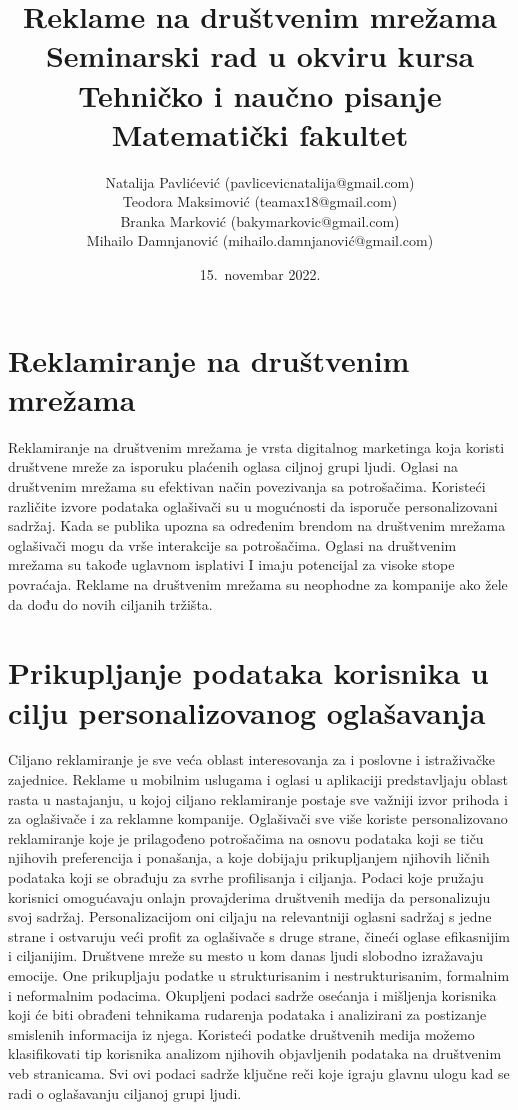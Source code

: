 \documentclass[a4paper]{article}
\title{Reklame na društvenim mrežama\\ \small{Seminarski rad u okviru kursa\\Tehničko i naučno pisanje\\ Matematički fakultet}}
\author{Natalija Pavlićević (pavlicevicnatalija@gmail.com)\\ Teodora Maksimović (teamax18@gmail.com)\\ Branka Marković (bakymarkovic@gmail.com)\\ Mihailo Damnjanović (mihailo.damnjanović@gmail.com)}
\date{15.~novembar 2022.}
\begin{document}
	
	
	\tableofcontents
	
	\newpage
	
	\section{Reklamiranje na društvenim mrežama}
	\label{sec:uvod}
	Reklamiranje na društvenim mrežama je vrsta digitalnog marketinga koja koristi društvene mreže za isporuku plaćenih oglasa ciljnoj grupi ljudi. Oglasi na društvenim mrežama su efektivan način povezivanja sa potrošačima. Koristeći različite izvore podataka oglašivači su u mogućnosti da isporuče personalizovani sadržaj. Kada se publika upozna sa određenim brendom na društvenim mrežama oglašivači mogu da vrše interakcije sa potrošačima. Oglasi na društvenim mrežama su takođe uglavnom isplativi I imaju potencijal za visoke stope povraćaja. Reklame na društvenim mrežama su neophodne za kompanije ako žele da dođu do novih ciljanih tržišta. 
	
	\section{Prikupljanje podataka korisnika u cilju personalizovanog oglašavanja}
	\label{sec:podaci}
	Ciljano reklamiranje je sve veća oblast interesovanja za i poslovne i istraživačke zajednice. Reklame u mobilnim uslugama i oglasi u aplikaciji predstavljaju oblast rasta u nastajanju, u kojoj ciljano reklamiranje postaje sve važniji izvor prihoda i za oglašivače i za reklamne kompanije. Oglašivači sve više koriste personalizovano reklamiranje koje je prilagođeno potrošačima na osnovu podataka koji se tiču njihovih preferencija i ponašanja, a koje dobijaju prikupljanjem njihovih ličnih podataka koji se obrađuju za svrhe profilisanja i ciljanja. Podaci koje pružaju korisnici omogućavaju onlajn provajderima društvenih medija da personalizuju svoj sadržaj. Personalizacijom oni ciljaju na relevantniji oglasni sadržaj s jedne strane i ostvaruju veći profit za oglašivače s druge strane, čineći oglase efikasnijim i ciljanijim.
	Društvene mreže su mesto u kom danas ljudi slobodno izražavaju emocije. One prikupljaju podatke u strukturisanim i nestrukturisanim, formalnim i neformalnim podacima. Okupljeni podaci sadrže osećanja i mišljenja korisnika koji će biti obrađeni tehnikama rudarenja podataka i analizirani za postizanje smislenih informacija iz njega. Koristeći podatke društvenih medija možemo klasifikovati tip korisnika analizom njihovih objavljenih podataka na društvenim veb stranicama. Svi ovi podaci sadrže ključne reči koje igraju glavnu ulogu kad se radi o oglašavanju ciljanoj grupi ljudi.
	
\end{document}
